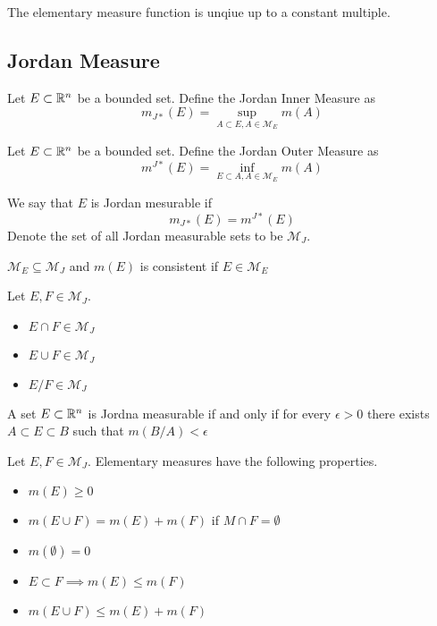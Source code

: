 \documentclass[a4paper]{article}
\begin{document}
\begin{thm} The elementary measure function is unqiue up to a constant multiple. 
\end{thm}

\subsection{Jordan Measure}
\begin{defn} Let $E\subset\mathbb{R}^n$ be a bounded set. Define the Jordan Inner Measure as $$m_{J\ast}(E)=\sup_{A\subset E,A\in\mathcal{M}_E}m(A)$$
\end{defn}

\begin{defn} Let $E\subset\mathbb{R}^n$ be a bounded set. Define the Jordan Outer Measure as $$m^{J\ast}(E)=\inf_{E\subset A,A\in\mathcal{M}_E}m(A)$$
\end{defn}

\begin{defn} We say that $E$ is Jordan mesurable if $$m_{J\ast}(E)=m^{J\ast}(E)$$ Denote the set of all Jordan measurable sets to be $\mathcal{M}_J$. 
\end{defn}

\begin{lmm} $\mathcal{M}_E\subseteq\mathcal{M}_J$ and $m(E)$ is consistent if $E\in\mathcal{M}_E$
\end{lmm}

\begin{prp} Let $E,F\in\mathcal{M}_J$. 
\begin{itemize}
\item $E\cap F\in\mathcal{M}_J$
\item $E\cup F\in\mathcal{M}_J$
\item $E/F\in\mathcal{M}_J$
\end{itemize}
\end{prp}

\begin{prp} A set $E\subset\mathbb{R}^n$ is Jordna measurable if and only if for every $\epsilon>0$ there exists $A\subset E\subset B$ such that $m(B/A)<\epsilon$
\end{prp}

\begin{prp} Let $E,F\in\mathcal{M}_J$. Elementary measures have the following properties. 
\begin{itemize}
\item $m(E)\geq 0$
\item $m(E\cup F)=m(E)+m(F)$ if $M\cap F=\emptyset$
\item $m(\emptyset)=0$
\item $E\subset F\implies m(E)\leq m(F)$
\item $m(E\cup F)\leq m(E)+m(F)$
\end{itemize}
\end{prp}
\end{document}
